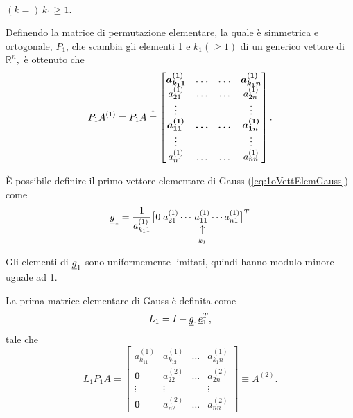 
\begin{remark}
    $(k=)\, k_1\geq 1.$
\end{remark}

Definendo la matrice di permutazione elementare, la quale è simmetrica e ortogonale, $P_1$, che scambia gli elementi 1 e $k_1(\geq 1)$ di un generico vettore di $\mathbb R^n,$ è ottenuto che 
\begin{equation*}
    P_1 A^{(1)} = P_1 A \overset{\footnotemark}{=}
    \begin{bmatrix}
        \boldsymbol{a_{k_1 1}^{(1)}} & \boldsymbol{\hdots} & \boldsymbol{\hdots} & \boldsymbol{a_{k_1n}^{(1)}}\\
        a_{21}^{(1)} & \hdots & \hdots & a_{2n}^{(1)}\\
        \vdots & & & \vdots\\
        \boldsymbol{a_{1 1}^{(1)}} & \boldsymbol{\hdots} & \boldsymbol{\hdots} & \boldsymbol{a_{1n}^{(1)}}\\
        \vdots & & & \vdots\\
        a_{n1}^{(1)} & \hdots & \hdots & a_{nn}^{(1)}
    \end{bmatrix}.
\end{equation*}

È possibile definire il primo vettore elementare di Gauss (\ref{eq:1oVettElemGauss}) come
\begin{equation*}
    \uline g_1=\frac{1}{a_{k_11}^{(1)}}\big[0\; a_{21}^{(1)}\cdots\, \vrightarrowup{a_{11}^{(1)}}{k_1}\cdots a_{n1}^{(1)}\big]^T
\end{equation*}
\begin{remark}
    Gli elementi di $\uline g_1$ sono uniformemente limitati, quindi hanno modulo minore uguale ad 1.
\end{remark}

La prima matrice elementare di Gauss è definita come
\begin{equation*}
    L_1 = I - \uline g_1 \uline e_1^T,
\end{equation*}
tale che
\begin{equation*}
    L_1 P_1 A = 
    \begin{bmatrix}
        a_{k_11}^{(1)} & a_{k_12}^{(1)} & \hdots & a_{k_1n}^{(1)}\\
        \boldsymbol 0 & a_{22}^{(2)} & \hdots & a_{2n}^{(2)}\\
        \vdots & \vdots & & \vdots\\
        \boldsymbol 0 & a_{n2}^{(2)} & \hdots & a_{nn}^{(2)}
    \end{bmatrix}\equiv A^{(2)}.
\end{equation*}

